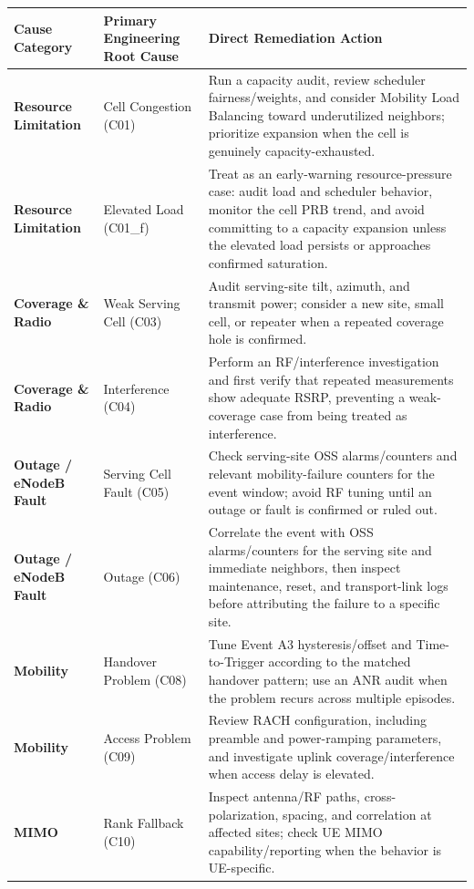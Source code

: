 \begin{table}[htbp]
\centering
\scriptsize
\begin{tabularx}{\textwidth}{>{\bfseries}p{3.0cm} p{4.0cm} X}
\toprule
Cause Category & Primary Engineering Root Cause & Direct Remediation Action\\
\midrule
Resource Limitation & Cell Congestion (C01) & Run a capacity audit, review scheduler fairness/weights, and consider Mobility Load Balancing toward underutilized neighbors; prioritize expansion when the cell is genuinely capacity-exhausted.\\
Resource Limitation & Elevated Load (C01\_f) & Treat as an early-warning resource-pressure case: audit load and scheduler behavior, monitor the cell PRB trend, and avoid committing to a capacity expansion unless the elevated load persists or approaches confirmed saturation.\\
Coverage \& Radio & Weak Serving Cell (C03) & Audit serving-site tilt, azimuth, and transmit power; consider a new site, small cell, or repeater when a repeated coverage hole is confirmed.\\
Coverage \& Radio & Interference (C04) & Perform an RF/interference investigation and first verify that repeated measurements show adequate RSRP, preventing a weak-coverage case from being treated as interference.\\
Outage / eNodeB Fault & Serving Cell Fault (C05) & Check serving-site OSS alarms/counters and relevant mobility-failure counters for the event window; avoid RF tuning until an outage or fault is confirmed or ruled out.\\
Outage / eNodeB Fault & Outage (C06) & Correlate the event with OSS alarms/counters for the serving site and immediate neighbors, then inspect maintenance, reset, and transport-link logs before attributing the failure to a specific site.\\
Mobility & Handover Problem (C08) & Tune Event A3 hysteresis/offset and Time-to-Trigger according to the matched handover pattern; use an ANR audit when the problem recurs across multiple episodes.\\
Mobility & Access Problem (C09) & Review RACH configuration, including preamble and power-ramping parameters, and investigate uplink coverage/interference when access delay is elevated.\\
MIMO & Rank Fallback (C10) & Inspect antenna/RF paths, cross-polarization, spacing, and correlation at affected sites; check UE MIMO capability/reporting when the behavior is UE-specific.\\

\end{tabularx}
\end{table}
